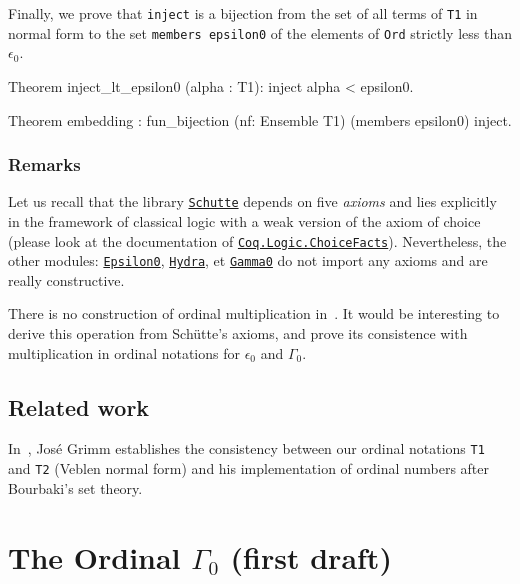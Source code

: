 {Finally, we prove that \texttt{inject} is a bijection from the set of all terms of \texttt{T1} in normal form to the set 
\texttt{members epsilon0} of the elements of \texttt{Ord} strictly less than  $\epsilon_0$.

\begin{Coqsrc}
Theorem inject_lt_epsilon0 (alpha : T1):
      inject alpha < epsilon0.

Theorem embedding : 
     fun_bijection (nf: Ensemble T1)  (members epsilon0) inject.
 \end{Coqsrc}

\subsection{Remarks}
Let us recall that the library \href{../theories/html/hydras.Schutte.Schutte.html}%
{\texttt{Schutte}} depends on five \emph{axioms} and lies explicitly in the  
framework of classical logic with a weak version of the axiom of choice
(please look at the documentation of
\href{https://coq.inria.fr/distrib/current/stdlib/Coq.Logic.ChoiceFacts.html}{\texttt{Coq.Logic.ChoiceFacts}}).
Nevertheless, the other modules:
\href{../theories/html/hydras.Epsilon0.Epsilon0.html}%
{\texttt{Epsilon0}},
\href{../theories/html/hydras.Hydra.Hydra.html}%
{\texttt{Hydra}}, et 
\href{../theories/html/hydras.Gamma0.Gamma0.html}%
{\texttt{Gamma0}}
do not import any axioms and are really constructive.

\begin{project}
There is no construction of ordinal multiplication in~\cite{schutte}. 
It would be interesting to derive this operation from Schütte's axioms,
and prove its consistence with multiplication in ordinal notations for 
$\epsilon_0$ and $\Gamma_0$.
\end{project}

\section{Related work}

In~\cite{grimm:hal-00911710}, José Grimm establishes the consistency between our ordinal notations \texttt{T1} and \texttt{T2} (Veblen normal form) and his implementation
of ordinal numbers after Bourbaki's set theory.


\chapter{The Ordinal \texorpdfstring{$\Gamma_0$}{Gamma0} (first draft)}


}

